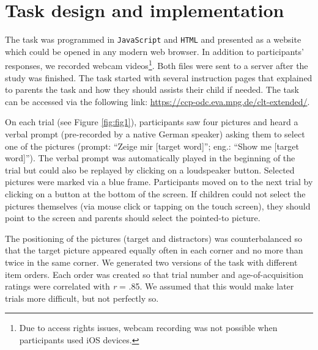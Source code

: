 \documentclass[
  man,floatsintext]{apa6}
\begin{document}
\hypertarget{task-design-and-implementation}{%
\section{Task design and implementation}\label{task-design-and-implementation}}

The task was programmed in \texttt{JavaScript} and \texttt{HTML} and presented as a website which could be opened in any modern web browser. In addition to participants' responses, we recorded webcam videos\footnote{Due to access rights issues, webcam recording was not possible when participants used iOS devices.}. Both files were sent to a server after the study was finished. The task started with several instruction pages that explained to parents the task and how they should assists their child if needed. The task can be accessed via the following link: \url{https://ccp-odc.eva.mpg.de/clt-extended/}.

On each trial (see Figure \ref{fig:fig1}), participants saw four pictures and heard a verbal prompt (pre-recorded by a native German speaker) asking them to select one of the pictures (prompt: ``Zeige mir {[}target word{]}''; eng.: ``Show me {[}target word{]}''). The verbal prompt was automatically played in the beginning of the trial but could also be replayed by clicking on a loudspeaker button. Selected pictures were marked via a blue frame. Participants moved on to the next trial by clicking on a button at the bottom of the screen. If children could not select the pictures themselves (via mouse click or tapping on the touch screen), they should point to the screen and parents should select the pointed-to picture.

The positioning of the pictures (target and distractors) was counterbalanced so that the target picture appeared equally often in each corner and no more than twice in the same corner. We generated two versions of the task with different item orders. Each order was created so that trial number and age-of-acquisition ratings were correlated with \emph{r} = .85. We assumed that this would make later trials more difficult, but not perfectly so.
\end{document}
